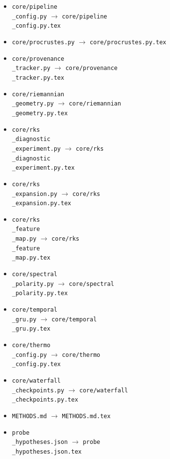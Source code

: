 \documentclass[11pt]{article}
\begin{document}
\begin{itemize}
\item \texttt{core/pipeline\\_config.py} $\rightarrow$ \texttt{core/pipeline\\_config.py.tex}
\item \texttt{core/procrustes.py} $\rightarrow$ \texttt{core/procrustes.py.tex}
\item \texttt{core/provenance\\_tracker.py} $\rightarrow$ \texttt{core/provenance\\_tracker.py.tex}
\item \texttt{core/riemannian\\_geometry.py} $\rightarrow$ \texttt{core/riemannian\\_geometry.py.tex}
\item \texttt{core/rks\\_diagnostic\\_experiment.py} $\rightarrow$ \texttt{core/rks\\_diagnostic\\_experiment.py.tex}
\item \texttt{core/rks\\_expansion.py} $\rightarrow$ \texttt{core/rks\\_expansion.py.tex}
\item \texttt{core/rks\\_feature\\_map.py} $\rightarrow$ \texttt{core/rks\\_feature\\_map.py.tex}
\item \texttt{core/spectral\\_polarity.py} $\rightarrow$ \texttt{core/spectral\\_polarity.py.tex}
\item \texttt{core/temporal\\_gru.py} $\rightarrow$ \texttt{core/temporal\\_gru.py.tex}
\item \texttt{core/thermo\\_config.py} $\rightarrow$ \texttt{core/thermo\\_config.py.tex}
\item \texttt{core/waterfall\\_checkpoints.py} $\rightarrow$ \texttt{core/waterfall\\_checkpoints.py.tex}
\item \texttt{METHODS.md} $\rightarrow$ \texttt{METHODS.md.tex}
\item \texttt{probe\\_hypotheses.json} $\rightarrow$ \texttt{probe\\_hypotheses.json.tex}

\end{itemize}
\end{document}
